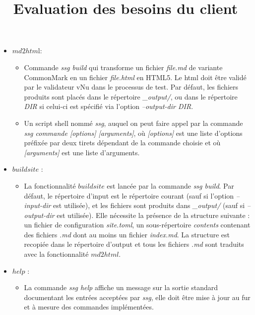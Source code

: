 \documentclass[a4paper, 11pt, openright, twoside]{article}
\title{Evaluation des besoins du client}
\date{\vspace{-10ex}}
\begin{document}
	
\maketitle

\begin{itemize}[label=\-]
\item $md2htm$l:
	\begin{itemize}[label=-]
		\item Commande \emph{ssg build} qui transforme un fichier \emph{file.md} de variante CommonMark en un fichier \emph{file.html} en HTML5. Le html doit être validé par le validateur vNu dans le processus de test. Par défaut, les fichiers produits sont placés dans le répertoire \emph{\_output/}, ou dans le répertoire \emph{DIR} si celui-ci est spécifié via l’option \emph{--output-dir DIR}.
		\item Un script shell nommé \emph{ssg}, auquel on peut faire appel par la commande \emph{ssg commande [options] [arguments]}, où \emph{[options]} est une liste d’options préfixée par deux tirets dépendant de la commande choisie et où \emph{[arguments]} est une liste d’arguments.
	\end{itemize}

\item $buildsite$ :
	\begin{itemize}[label=-]
		\item La fonctionnalité $buildsite$ est lancée par la commande \emph{ssg build}. Par défaut, le répertoire d’input est le répertoire courant (sauf si l’option\emph{ --input-dir} est utilisée), et les fichiers sont produits dans \emph{\_output/} (sauf si \emph{--output-dir} est utilisée). Elle nécessite la présence de la structure suivante : un fichier de configuration \emph{site.toml}, un sous-répertoire \emph{contents} contenant des fichiers \emph{.md} dont au moins un fichier\emph{ index.md}. La structure est recopiée dans le répertoire d'output et tous les fichiers \emph{.md} sont traduits avec la fonctionnalité $md2html$.
	\end{itemize}

\item $help$ :
	\begin{itemize}[label=-]
		\item 
La commande \emph{ssg help} affiche un message sur la sortie standard documentant les entrées acceptées par \emph{ssg}, elle doit être mise à jour au fur et à mesure des commandes implémentées.
	\end{itemize}


\end{itemize}
\end{document}

